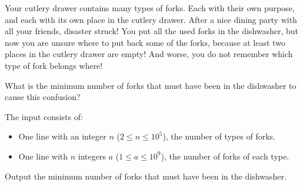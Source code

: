 

\newcommand{\maxn}{10^5}
\newcommand{\maxa}{10^9}

Your cutlery drawer contains many types of forks. Each with their own purpose,
and each with its own place in the cutlery drawer.
After a nice dining party with all your friends, disaster struck!
You put all the used forks in the dishwasher, but now
you are unsure where to put back some of the forks, because at least two
places in the cutlery drawer are empty! And worse, you do not remember which
type of fork belongs where!

What is the minimum number of forks that must have been in the dishwasher to cause this confusion?

\begin{Input}
    The input consists of:
    \begin{itemize}
        \item One line with an integer $n$ ($2\leq n\leq \maxn$), the number of types of forks.
        \item One line with $n$ integers $a$ ($1\leq a \leq \maxa$),
            the number of forks of each type.
    \end{itemize}
\end{Input}

\begin{Output}
    Output the minimum number of forks that must have been in the dishwasher.
\end{Output}

